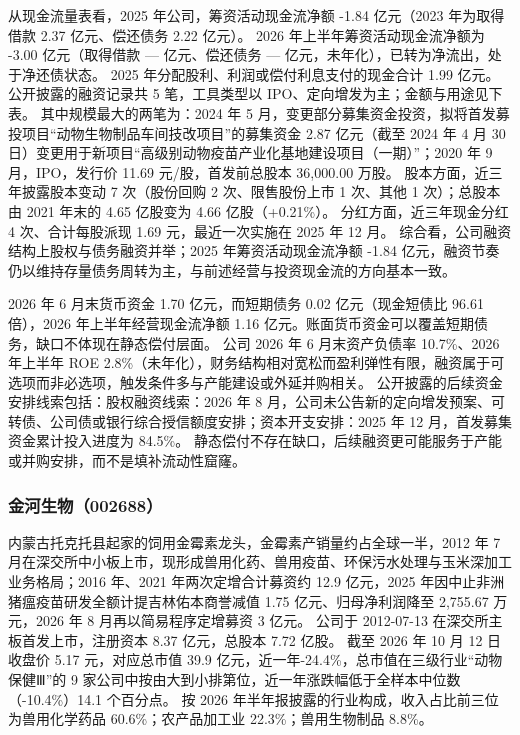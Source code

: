  从现金流量表看，2025 年公司，筹资活动现金流净额 -1.84 亿元（2023 年为取得借款 2.37 亿元、偿还债务 2.22 亿元）。 2026 年上半年筹资活动现金流净额为 -3.00 亿元（取得借款 — 亿元、偿还债务 — 亿元，未年化），已转为净流出，处于净还债状态。 2025 年分配股利、利润或偿付利息支付的现金合计 1.99 亿元。 公开披露的融资记录共 5 笔，工具类型以 IPO、定向增发为主；金额与用途见下表。 其中规模最大的两笔为：2024 年 5 月，变更部分募集资金投资，拟将首发募投项目“动物生物制品车间技改项目”的募集资金 2.87 亿元（截至 2024 年 4 月 30 日）变更用于新项目“高级别动物疫苗产业化基地建设项目（一期）”；2020 年 9 月，IPO，发行价 11.69 元/股，首发前总股本 36,000.00 万股。 股本方面，近三年披露股本变动 7 次（股份回购 2 次、限售股份上市 1 次、其他 1 次）；总股本由 2021 年末的 4.65 亿股变为 4.66 亿股（+0.21\%）。 分红方面，近三年现金分红 4 次、合计每股派现 1.69 元，最近一次实施在 2025 年 12 月。 综合看，公司融资结构上股权与债务融资并举；2025 年筹资活动现金流净额 -1.84 亿元，融资节奏仍以维持存量债务周转为主，与前述经营与投资现金流的方向基本一致。

 2026 年 6 月末货币资金 1.70 亿元，而短期债务 0.02 亿元（现金短债比 96.61 倍），2026 年上半年经营现金流净额 1.16 亿元。账面货币资金可以覆盖短期债务，缺口不体现在静态偿付层面。 公司 2026 年 6 月末资产负债率 10.7\%、2026 年上半年 ROE 2.8\%（未年化），财务结构相对宽松而盈利弹性有限，融资属于可选项而非必选项，触发条件多与产能建设或外延并购相关。 公开披露的后续资金安排线索包括：股权融资线索：2026 年 8 月，公司未公告新的定向增发预案、可转债、公司债或银行综合授信额度安排；资本开支安排：2025 年 12 月，首发募集资金累计投入进度为 84.5\%。 静态偿付不存在缺口，后续融资更可能服务于产能或并购安排，而不是填补流动性窟窿。




\subsubsection{金河生物（002688）}
\label{co:002688}

 内蒙古托克托县起家的饲用金霉素龙头，金霉素产销量约占全球一半，2012 年 7 月在深交所中小板上市，现形成兽用化药、兽用疫苗、环保污水处理与玉米深加工业务格局；2016 年、2021 年两次定增合计募资约 12.9 亿元，2025 年因中止非洲猪瘟疫苗研发全额计提吉林佑本商誉减值 1.75 亿元、归母净利润降至 2,755.67 万元，2026 年 8 月再以简易程序定增募资 3 亿元。 公司于 2012-07-13 在深交所主板首发上市，注册资本 8.37 亿元，总股本 7.72 亿股。 截至 2026 年 10 月 12 日收盘价 5.17 元，对应总市值 39.9 亿元，近一年-24.4\%，总市值在三级行业“动物保健Ⅲ”的 9 家公司中按由大到小排第位，近一年涨跌幅低于全样本中位数（-10.4\%）14.1 个百分点。 按 2026 年半年报披露的行业构成，收入占比前三位为兽用化学药品 60.6\%；农产品加工业 22.3\%；兽用生物制品 8.8\%。

